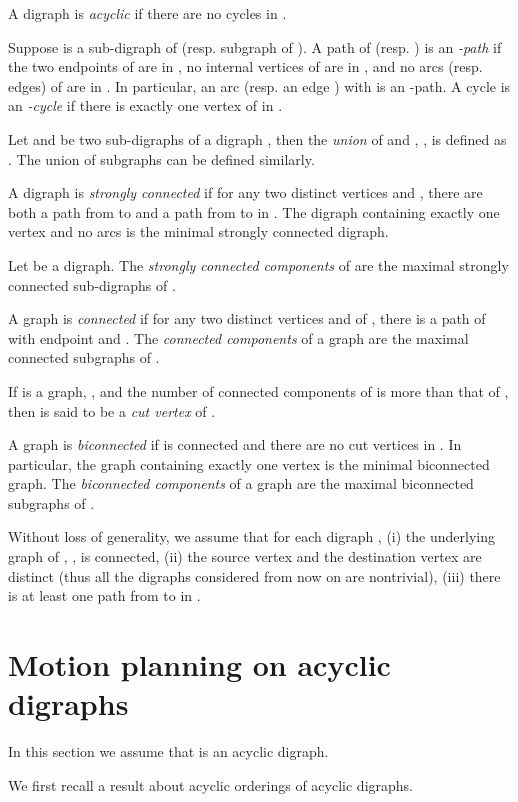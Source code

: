 \documentclass{article}
\begin{document}
A digraph  is \emph{acyclic} if there are no cycles in .

Suppose  is a sub-digraph of  (resp. subgraph
of ). A path  of  (resp. ) is an \emph{-path}
if the two endpoints of  are in , no internal vertices of 
are in , and no arcs (resp. edges) of  are in . In
particular, an arc  (resp. an edge
) with  is an -path. A
cycle  is an \emph{-cycle} if there is exactly one vertex of
 in .

Let  and  be two sub-digraphs of a
digraph , then the \emph{union} of  and , , is defined as .
The union of subgraphs can be defined similarly.

A digraph  is \emph{strongly connected} if for any two
distinct vertices  and , there are both a path from  to 
and a path from  to  in . The digraph containing exactly
one vertex and no arcs is the minimal strongly connected digraph.

Let  be a digraph. The \emph{strongly connected components}
of  are the maximal strongly connected sub-digraphs of .

A graph  is \emph{connected} if for any two distinct
vertices  and  of , there is a path of  with endpoint
 and . The \emph{connected components} of a graph  are the
maximal connected subgraphs of .



If  is a graph, , and the number of connected
components of  is more than that of , then  is said to be
a \emph{cut vertex} of .

A graph  is \emph{biconnected} if  is connected and there are
no cut vertices in . In particular, the graph containing exactly
one vertex is the minimal biconnected graph. The \emph{biconnected
components} of a graph  are the maximal biconnected subgraphs of
.

\medskip \noindent Without loss of generality, we assume
that for each digraph , (i) the underlying graph of ,
, is connected, (ii) the source vertex  and the
destination vertex  are distinct (thus all the digraphs
considered from now on are nontrivial), (iii) there is at least one
path from  to  in .





\section{Motion planning on acyclic digraphs}\label{sec:acyclic}
In this section we assume that  is an acyclic digraph.

We first recall a result about acyclic orderings of acyclic
digraphs.
\end{document}
